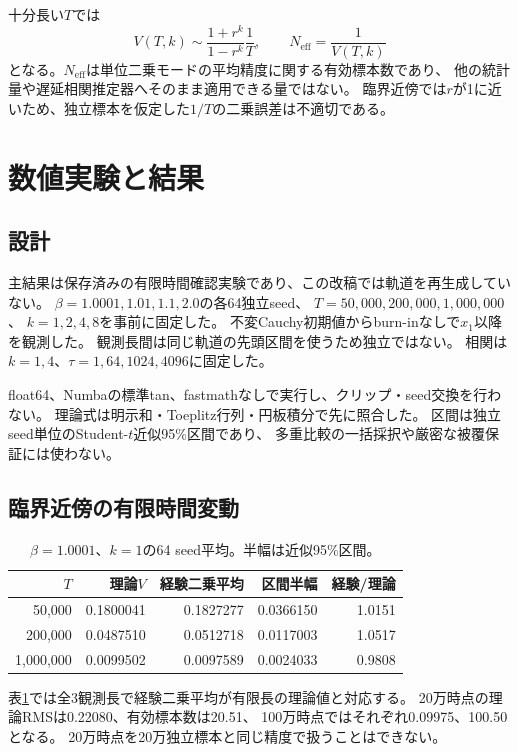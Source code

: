 \documentclass[a4paper,11pt]{jlreq}
\begin{document}
十分長い$T$では
\begin{equation}
V(T,k)\sim\frac{1+r^k}{1-r^k}\frac1T,\qquad N_{\mathrm{eff}}=\frac1{V(T,k)}
\end{equation}
となる。$N_{\mathrm{eff}}$は単位二乗モードの平均精度に関する有効標本数であり、
他の統計量や遅延相関推定器へそのまま適用できる量ではない。
臨界近傍では$r$が1に近いため、独立標本を仮定した$1/T$の二乗誤差は不適切である。

\section{数値実験と結果}
\subsection{設計}
主結果は保存済みの有限時間確認実験\cite{confirmation}であり、この改稿では軌道を再生成していない。
$\beta=1.0001,1.01,1.1,2.0$の各64独立seed、
$T=50{,}000,200{,}000,1{,}000{,}000$、
$k=1,2,4,8$を事前に固定した。
不変Cauchy初期値からburn-inなしで$x_1$以降を観測した。
観測長間は同じ軌道の先頭区間を使うため独立ではない。
相関は$k=1,4$、$\tau=1,64,1024,4096$に固定した。

float64、Numbaの標準tan、fastmathなしで実行し、クリップ・seed交換を行わない。
理論式は明示和・Toeplitz行列・円板積分で先に照合した。
区間は独立seed単位のStudent-$t$近似95\%区間であり、
多重比較の一括採択や厳密な被覆保証には使わない。

\subsection{臨界近傍の有限時間変動}
\begin{table}[htbp]\centering\small
\caption{$\beta=1.0001$、$k=1$の64 seed平均。半幅は近似95\%区間。}\label{tab:main}
\begin{tabular}{rrrrr}\toprule
$T$ & 理論$V$ & 経験二乗平均 & 区間半幅 & 経験/理論\\\midrule
50,000&0.1800041&0.1827277&0.0366150&1.0151\\
200,000&0.0487510&0.0512718&0.0117003&1.0517\\
1,000,000&0.0099502&0.0097589&0.0024033&0.9808\\\bottomrule
\end{tabular}
\end{table}
表\ref{tab:main}では全3観測長で経験二乗平均が有限長の理論値と対応する。
20万時点の理論RMSは0.22080、有効標本数は20.51、
100万時点ではそれぞれ0.09975、100.50となる。
20万時点を20万独立標本と同じ精度で扱うことはできない。
\end{document}
